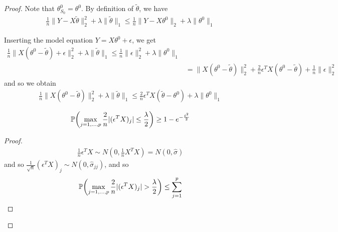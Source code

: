\begin{proof}
  Note that $\theta_{S_{0}}^{0} = \theta^{0}$.  By definition of
  $\tilde \theta$, we have
  \begin{align}
    \label{eq:122}
    \frac{1}{n} \| Y - X \tilde \theta \|_{2}^{2} + \lambda \| \tilde
    \theta \|_{1} \leq \frac{1}{n} \| Y - X \theta^{0} \|_{2} +
    \lambda \| \theta^{0} \|_{1}
  \end{align}

  Inserting the model equation $Y = X \theta^{0} + \epsilon$, we get
  \begin{align}
    \label{eq:123}
    \frac{1}{n} \| X(\theta^{0} - \tilde \theta) + \epsilon \|_{2}^{2}
    + \lambda \| \tilde \theta \|_{1} \leq \frac{1}{n} \| \epsilon
    \|_{2}^{2} + \lambda \| \theta^{0} \|_{1} \\
    &= \| X (\theta^{0} - \tilde \theta) \|_{2}^{2} + \frac{2}{n}
    \epsilon^{T} X (\theta^{0} - \tilde \theta) + \frac{1}{n} \|
    \epsilon \|_{2}^{2}
  \end{align} and so we obtain
  \begin{align}
    \label{eq:124}
    \frac{1}{n} \| X(\theta^{0} - \tilde \theta)\|_{2}^{2} + \lambda
    \| \tilde \theta \|_{1} \leq \frac{2}{n} \epsilon^{T} X (\tilde
    \theta - \theta^{0}) + \lambda \| \theta^{0} \|_{1}
  \end{align}

  \begin{lem}
    \begin{align}
      \label{eq:125}
      \Prob{\max_{j=1, \dots, p} \frac{2}{n} |(\epsilon^{T}X)_{j}|
        \leq \frac{\lambda}{2}} \geq 1 - e^{-\frac{t^{2}}{2}}
    \end{align}
  \end{lem}
  \begin{proof}
    \begin{align}
      \label{eq:126}
      \frac{1}{n} \epsilon^{T}X \sim N(0, \frac{1}{n} X^{T} X) = N(0,
      \hat \sigma)
    \end{align} and so $\frac{1}{\sqrt{n}} (\epsilon^{T}X)_{j} \sim
    N(0, \hat \sigma_{jj})$, and so
    \begin{align}
      \label{eq:127}
      \Prob{\max_{j=1, \dots, p} \frac{2}{n} |(\epsilon^{T} X)_{j}| >
        \frac{\lambda}{2}} \leq \sum_{j=1}^{p} \\
    \end{align}
  \end{proof}


\end{proof}
